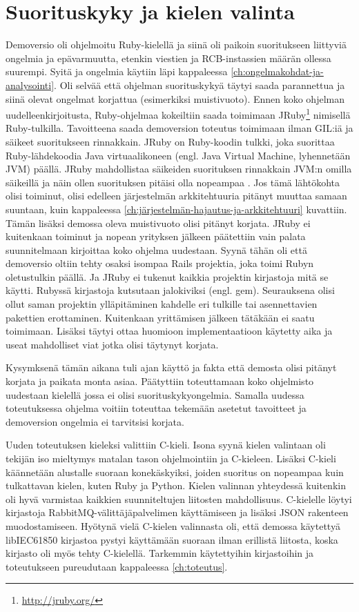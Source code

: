 \section{Suorituskyky ja kielen valinta}
Demoversio oli ohjelmoitu Ruby-kielellä ja siinä oli paikoin suoritukseen liittyviä ongelmia ja epävarmuutta, etenkin viestien ja RCB-instassien määrän ollessa suurempi. Syitä ja ongelmia käytiin läpi kappaleessa \ref{ch:ongelmakohdat-ja-analysointi}. Oli selvää että ohjelman suorituskykyä täytyi saada parannettua ja siinä olevat ongelmat korjattua (esimerkiksi muistivuoto). Ennen koko ohjelman uudelleenkirjoitusta, Ruby-ohjelmaa kokeiltiin saada toimimaan JRuby\footnote{\url{http://jruby.org/}} nimisellä Ruby-tulkilla. Tavoitteena saada demoversion toteutus toimimaan ilman GIL:iä ja säikeet suoritukseen rinnakkain. JRuby on Ruby-koodin tulkki, joka suorittaa Ruby-lähdekoodia Java virtuaalikoneen (engl. Java Virtual Machine, lyhennetään JVM) päällä. JRuby mahdollistaa säikeiden suorituksen rinnakkain JVM:n omilla säikeillä ja näin ollen suorituksen pitäisi olla nopeampaa \mbox{\cite{Youssef2013}}. Jos tämä lähtökohta olisi toiminut, olisi edelleen järjestelmän arkkitehtuuria pitänyt muuttaa samaan suuntaan, kuin kappaleessa \ref{ch:järjestelmän-hajautus-ja-arkkitehtuuri} kuvattiin. Tämän lisäksi demossa oleva muistivuoto olisi pitänyt korjata. JRuby ei kuitenkaan toiminut ja nopean yrityksen jälkeen päätettiin vain palata suunnitelmaan kirjoittaa koko ohjelma uudestaan. Syynä tähän oli että demoversio oltiin tehty osaksi isompaa Rails projektia, joka toimi Rubyn oletustulkin päällä. Ja JRuby ei tukenut kaikkia projektin kirjastoja mitä se käytti. Rubyssä kirjastoja kutsutaan jalokiviksi (engl. gem). Seurauksena olisi ollut saman projektin ylläpitäminen kahdelle eri tulkille tai asennettavien pakettien erottaminen. Kuitenkaan yrittämisen jälkeen tätäkään ei saatu toimimaan. Lisäksi täytyi ottaa huomioon implementaatioon käytetty aika ja useat mahdolliset viat jotka olisi täytynyt korjata.

Kysymksenä tämän aikana tuli ajan käyttö ja fakta että demosta olisi pitänyt korjata ja paikata monta asiaa. Päätyttiin toteuttamaan koko ohjelmisto uudestaan kielellä jossa ei olisi suorituskykyongelmia. Samalla uudessa toteutuksessa ohjelma voitiin toteuttaa tekemään asetetut tavoitteet ja demoversion ongelmia ei tarvitsisi korjata.

Uuden toteutuksen kieleksi valittiin C-kieli. Isona syynä kielen valintaan oli tekijän iso mieltymys matalan tason ohjelmointiin ja C-kieleen. Lisäksi C-kieli käännetään alustalle suoraan konekäskyiksi, joiden suoritus on nopeampaa kuin tulkattavan kielen, kuten Ruby ja Python. Kielen valinnan yhteydessä kuitenkin oli hyvä varmistaa kaikkien suunniteltujen liitosten mahdollisuus. C-kielelle löytyi kirjastoja RabbitMQ-välittäjäpalvelimen käyttämiseen ja lisäksi JSON rakenteen muodostamiseen. Hyötynä vielä C-kielen valinnasta oli, että demossa käytettyä libIEC61850 kirjastoa pystyi käyttämään suoraan ilman erillistä liitosta, koska kirjasto oli myös tehty C-kielellä. Tarkemmin käytettyihin kirjastoihin ja toteutukseen pureudutaan kappaleessa \ref{ch:toteutus}.


